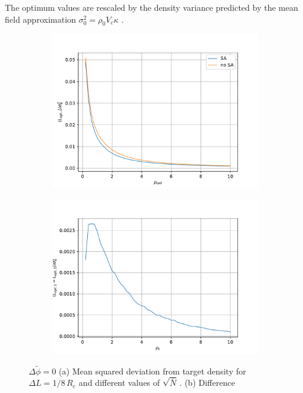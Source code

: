 \documentclass[bachelor,       %
               twoside,        %
               BCOR10mm,       %
               ngerman, english %
               ]{GAUBM}
\begin{document}
The optimum values are rescaled by the density variance predicted by the mean field approximation $\sigma^2_0=\rho_0V_c\kappa$ \cite{Daoulas06}.

 
\begin{figure}[h]
  \centering
  \begin{subfigure}[b]{0.45\textwidth}
      \centering
      \includegraphics[width=\textwidth]{figures/opt_var_rhoc_dphi0.pdf}
      \caption{}
      \label{fig:opt_var_rhoc_dphi0}
  \end{subfigure}
    \hfill
  \begin{subfigure}[b]{0.45\textwidth}
      \centering
      \includegraphics[width=\textwidth]{figures/diff_var_rhoc_dphi0.pdf}
      \caption{}
      \label{fig:diff_var_rhoc_dphi0}
  \end{subfigure}
     \caption{$\Delta\tilde\phi=0 $ (a) Mean squared deviation from target density for $\Delta L=1/8\,R_e$ and different values of $\sqrt{\bar N}\,.$ (b) Difference}
     \label{fig:var_rhoc_dphi0}
\end{figure}
\end{document}
